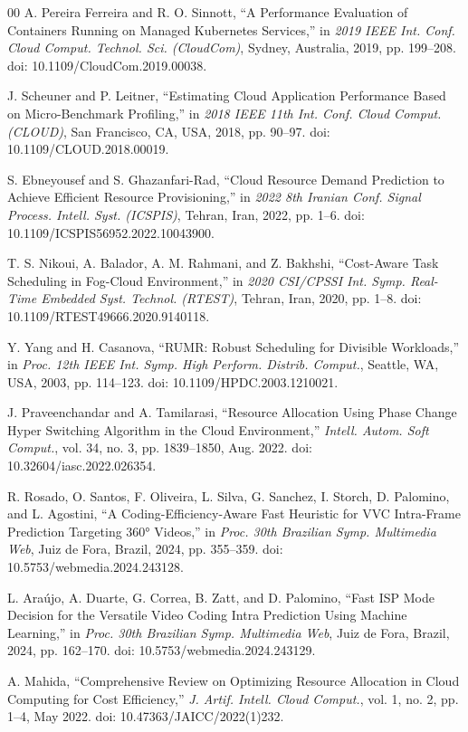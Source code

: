 \documentclass[conference]{IEEEtran}
\begin{document}
\begin{thebibliography}{00}
		 A. Pereira Ferreira and R. O. Sinnott, ``A Performance Evaluation of Containers Running on Managed Kubernetes Services,'' in \emph{2019 IEEE Int. Conf. Cloud Comput. Technol. Sci. (CloudCom)}, Sydney, Australia, 2019, pp. 199--208. doi: 10.1109/CloudCom.2019.00038.
		
		 J. Scheuner and P. Leitner, ``Estimating Cloud Application Performance Based on Micro-Benchmark Profiling,'' in \emph{2018 IEEE 11th Int. Conf. Cloud Comput. (CLOUD)}, San Francisco, CA, USA, 2018, pp. 90--97. doi: 10.1109/CLOUD.2018.00019.
		
		 S. Ebneyousef and S. Ghazanfari-Rad, ``Cloud Resource Demand Prediction to Achieve Efficient Resource Provisioning,'' in \emph{2022 8th Iranian Conf. Signal Process. Intell. Syst. (ICSPIS)}, Tehran, Iran, 2022, pp. 1--6. doi: 10.1109/ICSPIS56952.2022.10043900.
		
		 T. S. Nikoui, A. Balador, A. M. Rahmani, and Z. Bakhshi, ``Cost-Aware Task Scheduling in Fog-Cloud Environment,'' in \emph{2020 CSI/CPSSI Int. Symp. Real-Time Embedded Syst. Technol. (RTEST)}, Tehran, Iran, 2020, pp. 1--8. doi: 10.1109/RTEST49666.2020.9140118.
		
		 Y. Yang and H. Casanova, ``RUMR: Robust Scheduling for Divisible Workloads,'' in \emph{Proc. 12th IEEE Int. Symp. High Perform. Distrib. Comput.}, Seattle, WA, USA, 2003, pp. 114--123. doi: 10.1109/HPDC.2003.1210021.
		
		 J. Praveenchandar and A. Tamilarasi, ``Resource Allocation Using Phase Change Hyper Switching Algorithm in the Cloud Environment,'' \emph{Intell. Autom. Soft Comput.}, vol. 34, no. 3, pp. 1839--1850, Aug. 2022. doi: 10.32604/iasc.2022.026354.
		
		 R. Rosado, O. Santos, F. Oliveira, L. Silva, G. Sanchez, I. Storch, D. Palomino, and L. Agostini, ``A Coding-Efficiency-Aware Fast Heuristic for VVC Intra-Frame Prediction Targeting 360° Videos,'' in \emph{Proc. 30th Brazilian Symp. Multimedia Web}, Juiz de Fora, Brazil, 2024, pp. 355--359. doi: 10.5753/webmedia.2024.243128.
		
		 L. Araújo, A. Duarte, G. Correa, B. Zatt, and D. Palomino, ``Fast ISP Mode Decision for the Versatile Video Coding Intra Prediction Using Machine Learning,'' in \emph{Proc. 30th Brazilian Symp. Multimedia Web}, Juiz de Fora, Brazil, 2024, pp. 162--170. doi: 10.5753/webmedia.2024.243129.
		
		 A. Mahida, ``Comprehensive Review on Optimizing Resource Allocation in Cloud Computing for Cost Efficiency,'' \emph{J. Artif. Intell. Cloud Comput.}, vol. 1, no. 2, pp. 1--4, May 2022. doi: 10.47363/JAICC/2022(1)232.
		

\end{thebibliography}
\end{document}
